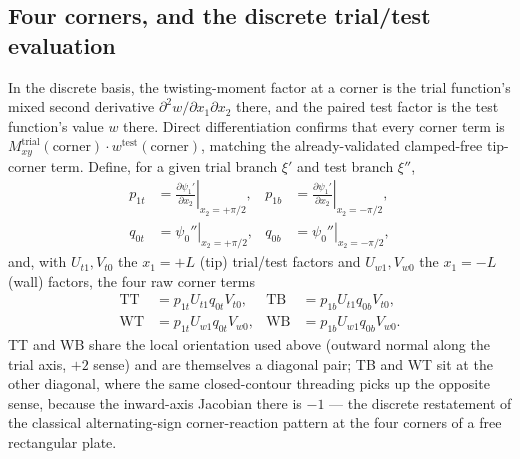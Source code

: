 \documentclass[11pt]{article}
\begin{document}
\subsection{Four corners, and the discrete trial/test evaluation}\label{sec:sm-four}
In the discrete basis, the twisting-moment factor at a corner is the
trial function's mixed second derivative
$\partial^2 w/\partial x_1\partial x_2$ there, and the paired test factor
is the test function's value $w$ there. Direct differentiation confirms
that every corner term is
$M_{xy}^{\mathrm{trial}}(\mathrm{corner})\cdot
w^{\mathrm{test}}(\mathrm{corner})$, matching the already-validated
clamped-free tip-corner term. Define, for a given trial branch $\xi'$
and test branch $\xi''$,
\begin{equation}
\begin{aligned}
p_{1t}&=\left.\frac{\partial\psi_1'}{\partial x_2}\right|_{x_2=+\pi/2},&
p_{1b}&=\left.\frac{\partial\psi_1'}{\partial x_2}\right|_{x_2=-\pi/2},\\
q_{0t}&=\left.\psi_0''\right|_{x_2=+\pi/2},&
q_{0b}&=\left.\psi_0''\right|_{x_2=-\pi/2},
\end{aligned}
\label{eq:sm-pq}
\end{equation}
and, with $U_{t1},V_{t0}$ the $x_1=+L$ (tip) trial/test factors and
$U_{w1},V_{w0}$ the $x_1=-L$ (wall) factors, the four raw corner terms
\begin{equation}
\begin{aligned}
\mathrm{TT}&=p_{1t}U_{t1}q_{0t}V_{t0},&
\mathrm{TB}&=p_{1b}U_{t1}q_{0b}V_{t0},\\
\mathrm{WT}&=p_{1t}U_{w1}q_{0t}V_{w0},&
\mathrm{WB}&=p_{1b}U_{w1}q_{0b}V_{w0}.
\end{aligned}
\label{eq:sm-tt}
\end{equation}
TT and WB share the local orientation used above (outward normal along
the trial axis, $+2$ sense) and are themselves a diagonal pair; TB and WT
sit at the other diagonal, where the same closed-contour threading picks
up the opposite sense,
because the inward-axis Jacobian there is $-1$ --- the discrete
restatement of the classical alternating-sign corner-reaction pattern at
the four corners of a free rectangular plate.
\end{document}
